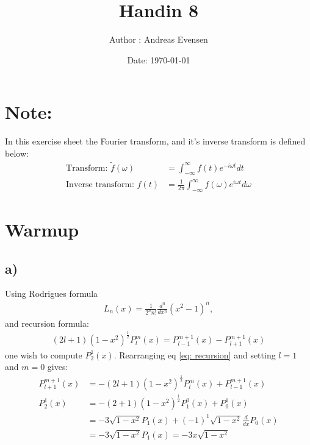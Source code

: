 \documentclass{article}
\title{Handin 8}
\author{Author : Andreas Evensen}
\date{Date: \today}
\newcommand{\w}{\omega}
\begin{document}
\maketitle

\section*{Note:}
In this exercise sheet the Fourier transform, and it's inverse transform is defined below:
\begin{align*}
    \text{Transform: } \tilde{f}(\w) &=\int_{-\infty}^{\infty} f(t)e^{-i\w t}dt\\
    \text{Inverse transform: } {f}(t) &=\frac{1}{2\pi}\int_{-\infty}^{\infty} f(\w)e^{i\w t}d\w
\end{align*}

\section*{Warmup}
\subsection*{a)}
Using Rodrigues formula
\begin{align*}
    L_n(x) = \frac{1}{2^nn!}\frac{d^n}{dx^n}(x^2-1)^n,
\end{align*}and recursion formula:
\begin{align}
    (2l +  1)(1-x^2)^{\frac{1}{2}}P_{l}^m(x) = P_{l - 1}^{m + 1}(x) - P_{l + 1}^{m + 1}(x) \label{eq: recursion}
\end{align}one wish to compute $P_2^1(x)$. Rearranging eq \eqref{eq: recursion} and setting $l =1$ and $m = 0$ gives:
\begin{align*}
    P_{l + 1}^{m + 1}(x) &= -(2l +  1)(1-x^2)^{\frac{1}{2}}P_{l}^m(x) + P_{l - 1}^{m + 1}(x)\\
    P_{2}^1(x) &= -(2 +  1)(1-x^2)^{\frac{1}{2}}P_{1}^0(x) + P_{0}^1(x)\\
    &= -3\sqrt{1- x^2}P_1(x) + (-1)^1\sqrt{1 - x^2}\frac{d}{dx}P_0(x)\\
    &= -3\sqrt{1- x^2}P_1(x) = -3x\sqrt{1 - x^2} 
\end{align*}
\end{document}
